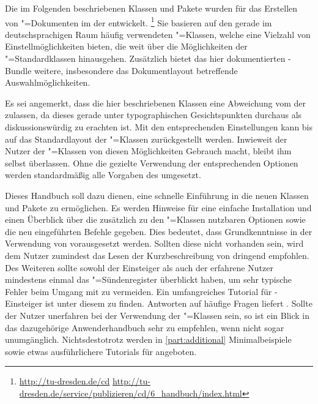 \addchap{\prefacename}
Die im Folgenden beschriebenen Klassen und Pakete wurden für das Erstellen von 
"=Dokumenten im \CD der \TnUD entwickelt.%
\footnote{%
  \url{http://tu-dresden.de/cd}\hfill
  \url{http://tu-dresden.de/service/publizieren/cd/6_handbuch/index.html}%
}
Sie basieren auf den gerade im deutschsprachigen Raum häufig verwendeten 
\KOMAScript"=Klassen, welche eine Vielzahl von Einstellmöglichkeiten bieten, 
die weit über die Möglichkeiten der "=Standardklassen 
hinausgehen. Zusätzlich bietet das hier dokumentierten \TUDScript-Bundle 
weitere, insbesondere das Dokumentlayout betreffende Auswahlmöglichkeiten.

Es sei angemerkt, dass die hier beschriebenen Klassen eine Abweichung vom \CD 
der \TnUD zulassen, da dieses gerade unter typographischen Gesichtspunkten 
durchaus als diskussionswürdig zu erachten ist. Mit den entsprechenden 
Einstellungen kann bis auf das Standardlayout der \KOMAScript"=Klassen 
zurückgestellt werden. Inwieweit der Nutzer der \TUDScript"=Klassen von diesen 
Möglichkeiten Gebrauch macht, bleibt ihm selbst überlassen. Ohne die gezielte 
Verwendung der entsprechenden Optionen werden standardmäßig alle Vorgaben des 
\CDs umgesetzt.

Dieses Handbuch soll dazu dienen, eine schnelle Einführung in die neuen Klassen
und Pakete zu ermöglichen. Es werden Hinweise für eine einfache Installation 
und einen Überblick über die zusätzlich zu den \KOMAScript"=Klassen nutzbaren 
Optionen sowie die neu eingeführten Befehle gegeben. Dies bedeutet, dass 
Grundkenntnisse in der Verwendung von  vorausgesetzt werden. 
Sollten diese nicht vorhanden sein, wird dem Nutzer zumindest das Lesen der 
Kurzbeschreibung von 
dringend empfohlen. Des Weiteren sollte sowohl der Einsteiger als auch der 
erfahrene Nutzer mindestens einmal das "=Sündenregister
überblickt haben, um sehr typische Fehler beim Umgang mit  zu 
vermeiden. Ein umfangreiches Tutorial für -Einsteiger ist unter 
diesem  zu finden. 
Antworten auf häufige Fragen liefert
. Sollte der Nutzer 
unerfahren bei der Verwendung der \KOMAScript"=Klassen sein, so ist ein Blick 
in das dazugehörige Anwenderhandbuch \scrguide sehr zu empfehlen, wenn nicht 
sogar unumgänglich. Nichtsdestotrotz werden in \autoref{part:additional} 
Minimalbeispiele sowie etwas ausführlichere Tutorials für angeboten. 

